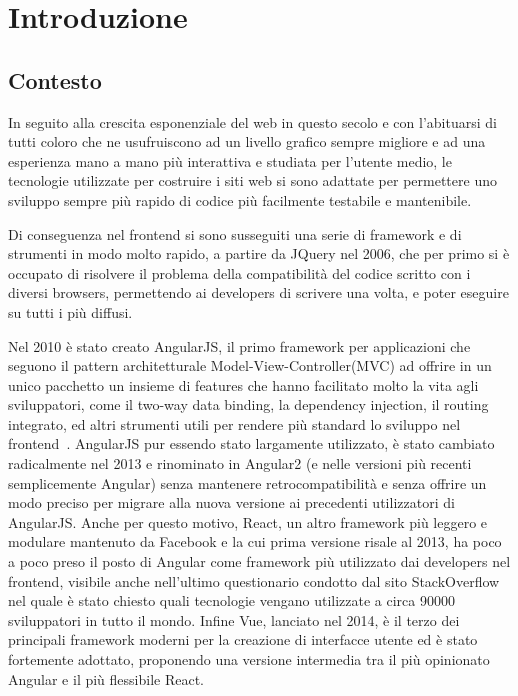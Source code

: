\chapter{Introduzione}\label{cap:introduzione}

\section{Contesto}\label{sez:contesto}

In seguito alla crescita esponenziale del web in questo secolo e con l'abituarsi di tutti coloro che ne usufruiscono ad un livello grafico sempre migliore e ad una esperienza mano a mano pi\`u interattiva e studiata per l'utente medio, le tecnologie utilizzate per costruire i siti web si sono adattate per permettere uno sviluppo sempre pi\`u rapido di codice pi\`u facilmente testabile e mantenibile.

Di conseguenza nel frontend si sono susseguiti una serie di framework e di strumenti in modo molto rapido, a partire da JQuery\cite{jquery} nel 2006, che per primo si \`e occupato di risolvere il problema della compatibilit\`a del codice scritto con i diversi browsers, permettendo ai developers di scrivere una volta, e poter eseguire su tutti i pi\`u diffusi.

Nel 2010 \`e stato creato AngularJS, il primo framework per applicazioni che seguono il pattern architetturale Model-View-Controller(MVC) ad offrire in un unico pacchetto un insieme di features che hanno facilitato molto la vita agli sviluppatori, come il two-way data binding, la dependency injection, il routing integrato, ed altri strumenti utili per rendere pi\`u standard lo sviluppo nel frontend~\cite{Hoff}.
AngularJS pur essendo stato largamente utilizzato, \`e stato cambiato radicalmente nel 2013 e rinominato in Angular2 (e nelle versioni pi\`u recenti semplicemente Angular) senza mantenere retrocompatibilit\`a e senza offrire un modo preciso per migrare alla nuova versione ai precedenti utilizzatori di AngularJS.
Anche per questo motivo, React, un altro framework pi\`u leggero e modulare mantenuto da Facebook e la cui prima versione risale al 2013, ha poco a poco preso il posto di Angular come framework pi\`u utilizzato dai developers nel frontend, visibile anche nell'ultimo questionario condotto dal sito StackOverflow nel quale \`e stato chiesto quali tecnologie vengano utilizzate a circa 90000 sviluppatori in tutto il mondo\cite{stackOverflow2019}.
Infine Vue, lanciato nel 2014, \`e il terzo dei principali framework moderni per la creazione di interfacce utente ed \`e stato fortemente adottato, proponendo una versione intermedia tra il pi\`u opinionato Angular e il pi\`u flessibile React\cite{vueJs}.

